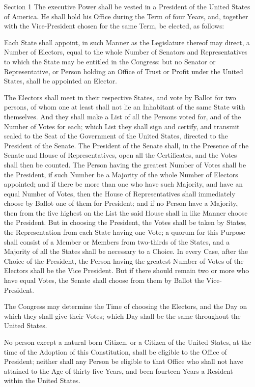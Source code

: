 \documentclass[12pt,a4paper]{article}
\begin{document}
Section 1
The executive Power shall be vested in a President of the United States of
America. He shall hold his Office during the Term of four Years, and, together
with the Vice-President chosen for the same Term, be elected, as follows:

Each State shall appoint, in such Manner as the Legislature thereof may direct,
a Number of Electors, equal to the whole Number of Senators and Representatives
to which the State may be entitled in the Congress: but no Senator or
Representative, or Person holding an Office of Trust or Profit under the United
States, shall be appointed an Elector.

The Electors shall meet in their respective States, and vote by Ballot for two
persons, of whom one at least shall not lie an Inhabitant of the same State
with themselves. And they shall make a List of all the Persons voted for, and
of the Number of Votes for each; which List they shall sign and certify, and
transmit sealed to the Seat of the Government of the United States, directed to
the President of the Senate. The President of the Senate shall, in the Presence
of the Senate and House of Representatives, open all the Certificates, and the
Votes shall then be counted. The Person having the greatest Number of Votes
shall be the President, if such Number be a Majority of the whole Number of
Electors appointed; and if there be more than one who have such Majority, and
have an equal Number of Votes, then the House of Representatives shall
immediately choose by Ballot one of them for President; and if no Person have a
Majority, then from the five highest on the List the said House shall in like
Manner choose the President. But in choosing the President, the Votes shall be
taken by States, the Representation from each State having one Vote; a quorum
for this Purpose shall consist of a Member or Members from two-thirds of the
States, and a Majority of all the States shall be necessary to a Choice. In
every Case, after the Choice of the President, the Person having the greatest
Number of Votes of the Electors shall be the Vice President. But if there
should remain two or more who have equal Votes, the Senate shall choose from
them by Ballot the Vice-President.

The Congress may determine the Time of choosing the Electors, and the Day on
which they shall give their Votes; which Day shall be the same throughout the
United States.

No person except a natural born Citizen, or a Citizen of the United States, at
the time of the Adoption of this Constitution, shall be eligible to the Office
of President; neither shall any Person be eligible to that Office who shall not
have attained to the Age of thirty-five Years, and been fourteen Years a
Resident within the United States.
\end{document}
